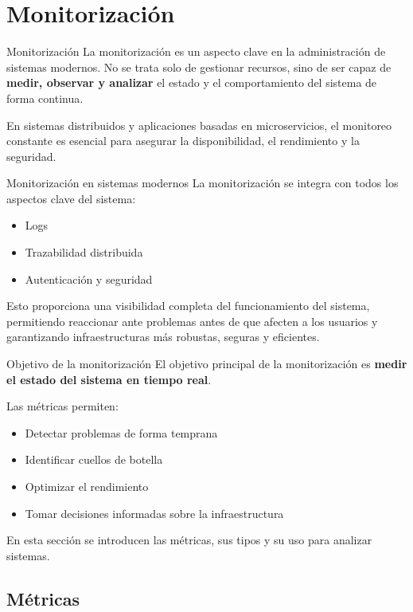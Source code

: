 \documentclass{beamer}
\begin{document}
\section{Monitorización}

\begin{frame}{Monitorización}
La monitorización es un aspecto clave en la administración de sistemas modernos. No se trata solo de gestionar recursos, sino de ser capaz de \textbf{medir, observar y analizar} el estado y el comportamiento del sistema de forma continua.

En sistemas distribuidos y aplicaciones basadas en microservicios, el monitoreo constante es esencial para asegurar la disponibilidad, el rendimiento y la seguridad.
\end{frame}

\begin{frame}{Monitorización en sistemas modernos}
La monitorización se integra con todos los aspectos clave del sistema:
\begin{itemize}
  \item Logs
  \item Trazabilidad distribuida
  \item Autenticación y seguridad
\end{itemize}

Esto proporciona una visibilidad completa del funcionamiento del sistema, permitiendo reaccionar ante problemas antes de que afecten a los usuarios y garantizando infraestructuras más robustas, seguras y eficientes.
\end{frame}

\begin{frame}{Objetivo de la monitorización}
El objetivo principal de la monitorización es \textbf{medir el estado del sistema en tiempo real}.

Las métricas permiten:
\begin{itemize}
  \item Detectar problemas de forma temprana
  \item Identificar cuellos de botella
  \item Optimizar el rendimiento
  \item Tomar decisiones informadas sobre la infraestructura
\end{itemize}

En esta sección se introducen las métricas, sus tipos y su uso para analizar sistemas.
\end{frame}

\subsection{Métricas}
\end{document}
